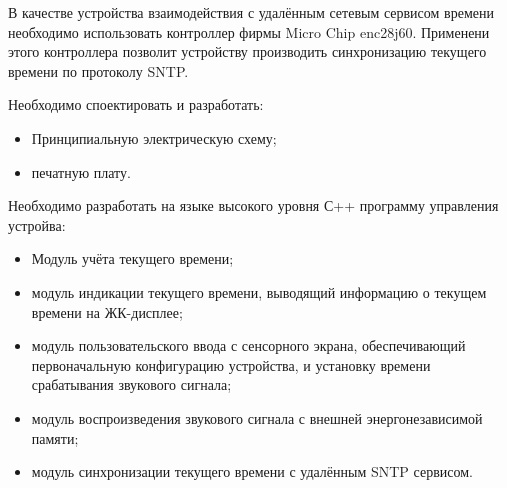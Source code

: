 \begin{par}
В качестве устройства взаимодействия с удалённым сетевым сервисом времени необходимо использовать
контроллер фирмы Micro Chip enc28j60. Применени этого контроллера позволит устройству производить
синхронизацию текущего времени по протоколу SNTP.
\end{par}

\begin{par}
Необходимо споектировать и разработать:
    \begin{itemize}
        \item{}Принципиальную электрическую схему;
        \item{}печатную плату.
    \end{itemize}
\end{par}

\begin{par}
Необходимо разработать на языке высокого уровня С++  программу управления устройва:
\begin{itemize}
    \item{} Модуль учёта текущего времени;
    \item{} модуль индикации текущего времени, выводящий информацию о текущем времени на ЖК-дисплее;
    \item{} модуль пользовательского ввода с сенсорного экрана, обеспечивающий первоначальную
            конфигурацию устройства, и установку времени срабатывания звукового сигнала;
    \item{} модуль воспроизведения звукового сигнала с внешней энергонезависимой памяти;
    \item{} модуль синхронизации текущего времени с удалённым SNTP сервисом.
\end{itemize}
\end{par}
\newpage{}
